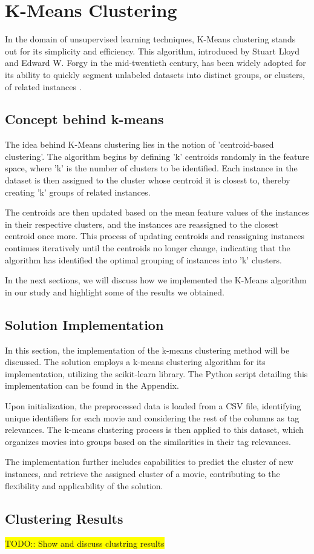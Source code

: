 \section{K-Means Clustering}
In the domain of unsupervised learning techniques, K-Means clustering stands out for its simplicity and efficiency. This algorithm, introduced by Stuart Lloyd and Edward W. Forgy in the mid-twentieth century, has been widely adopted for its ability to quickly segment unlabeled datasets into distinct groups, or clusters, of related instances \cite{ref_handsOnMachineLearning}.

\subsection{Concept behind k-means}
The idea behind K-Means clustering lies in the notion of 'centroid-based clustering'. The algorithm begins by defining 'k' centroids randomly in the feature space, where 'k' is the number of clusters to be identified. Each instance in the dataset is then assigned to the cluster whose centroid it is closest to, thereby creating 'k' groups of related instances. 

The centroids are then updated based on the mean feature values of the instances in their respective clusters, and the instances are reassigned to the closest centroid once more. This process of updating centroids and reassigning instances continues iteratively until the centroids no longer change, indicating that the algorithm has identified the optimal grouping of instances into 'k' clusters.\cite{ref_handsOnMachineLearning} 

In the next sections, we will discuss how we implemented the K-Means algorithm in our study and highlight some of the results we obtained.

\subsection{Solution Implementation}

In this section, the implementation of the k-means clustering method will be discussed. The solution employs a k-means clustering algorithm for its implementation, utilizing the scikit-learn library. The Python script detailing this implementation can be found in the Appendix.

Upon initialization, the preprocessed data is loaded from a CSV file, identifying unique identifiers for each movie and considering the rest of the columns as tag relevances. The k-means clustering process is then applied to this dataset, which organizes movies into groups based on the similarities in their tag relevances.

The implementation further includes capabilities to predict the cluster of new instances, and retrieve the assigned cluster of a movie, contributing to the flexibility and applicability of the solution.

\subsection{Clustering Results}
 \colorbox{yellow}{TODO:: Show and discuss clustring results }\\